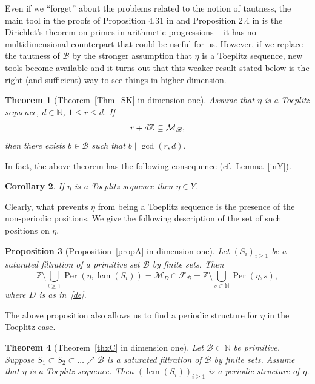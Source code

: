 \documentclass[leqno,a4paper,12pt]{article}
\DeclareMathOperator{\lcm}{lcm}
\newtheorem{Th}{Theorem}[section]
\newtheorem{Prop}[Th]{Proposition}
\newtheorem{Cor}[Th]{Corollary}
\theoremstyle{definition}
\newcommand{\divides}{\mid}
\newcommand{\Per}{\operatorname{Per}\nolimits}
\newcommand{\cM}{{\cal M}}
\newcommand{\Z}{{\mathbb{Z}}}
\newcommand{\N}{{\mathbb{N}}}
\newcommand{\sB}{\mathscr{B}}
\begin{document}
Even if we ``forget'' about the problems related to the notion of tautness, the main tool in the proofs of Proposition 4.31 in \cite{MR3803141} and Proposition 2.4 in \cite{DKK} is the Dirichlet's theorem on primes in arithmetic progressions -- it has no multidimensional counterpart that could be useful for us. However, if we replace the tautness of $\sB$ by the stronger assumption that $\eta$ is a Toeplitz sequence, new tools become available and it turns out that this weaker result stated below is the right (and sufficient) way to see things in higher dimension.
\begin{Th}[Theorem~\ref{Thm_SK} in dimension one]\label{druggi2Toeplitz}
Assume that $\eta$ is a Toeplitz sequence, $d\in\N$, $1\leq r\leq d$. If
\[r+d\Z\subseteq \cM_\sB,\]
then there exists $b\in\sB$ such that $b\divides\gcd(r,d)$.
\end{Th}
In fact, the above theorem has the following consequence (cf.\ Lemma~\ref{inY}).
\begin{Cor}\label{Toeplitz_SK_one}
If $\eta$ is a Toeplitz sequence then $\eta\in Y$.
\end{Cor}
Clearly, what prevents $\eta$ from being a Toeplitz sequence is the presence of the non-periodic positions. We give the following description of the set of such positions on $\eta$.
\begin{Prop}[Proposition~\ref{propA} in dimension one]\label{lemmaA_one}
Let $(S_i)_{i\geq1}$ be a saturated filtration of a primitive set $\sB$ by finite sets. Then
\begin{equation}\label{teza1}
\Z\setminus\bigcup_{i\geq1}\Per(\eta,\lcm(S_i))=\mathcal{M}_{D}\cap \mathcal{F}_{\sB}=\Z\setminus \bigcup_{s\subset \N}\Per(\eta,s),
\end{equation}
where $D$ is as in~\eqref{de}.
\end{Prop}
The above proposition also allows us to find a periodic structure for $\eta$ in the Toeplitz case.
\begin{Th}[Theorem~\ref{thxC} in dimension one]\label{structure1}
Let $\sB\subset\N$ be primitive. Suppose $S_1\subset S_2\subset\dots\nearrow\sB$ is a saturated filtration of $\sB$ by finite sets. Assume that $\eta$ is a Toeplitz sequence. Then $(\lcm(S_i))_{i\geq1}$ is a periodic structure of $\eta$.
\end{Th}
\end{document}
